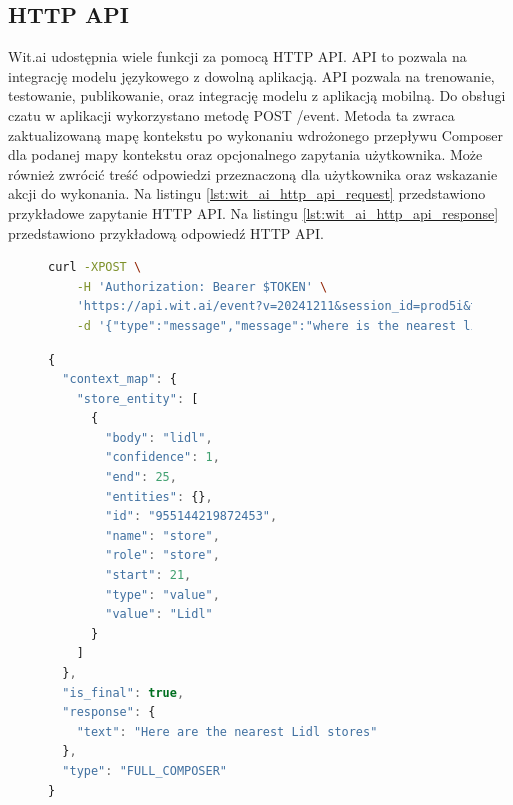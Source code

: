 \subsection{HTTP API}
Wit.ai udostępnia wiele funkcji za pomocą HTTP API. API to pozwala na integrację modelu językowego z dowolną aplikacją. API pozwala na trenowanie, testowanie, publikowanie, oraz integrację modelu z aplikacją mobilną. Do obsługi czatu w aplikacji wykorzystano metodę POST /event. Metoda ta zwraca zaktualizowaną mapę kontekstu po wykonaniu wdrożonego przepływu Composer dla podanej mapy kontekstu oraz opcjonalnego zapytania użytkownika. Może również zwrócić treść odpowiedzi przeznaczoną dla użytkownika oraz wskazanie akcji do wykonania. \cite{witai_http_api} Na listingu \ref{lst:wit_ai_http_api_request} przedstawiono przykładowe zapytanie HTTP API.
Na listingu \ref{lst:wit_ai_http_api_response} przedstawiono przykładową odpowiedź HTTP API.

\begin{figure}[H]
\begin{lstlisting}[language=bash, caption=Przykładowe zapytanie HTTP API, label=lst:wit_ai_http_api_request]
    curl -XPOST \
    -H 'Authorization: Bearer $TOKEN' \
    'https://api.wit.ai/event?v=20241211&session_id=prod5i&tag=1.0&context_map=%7B%7D' \
    -d '{"type":"message","message":"where is the nearest lidl?"}'  
\end{lstlisting}
\end{figure}
\label{lst:wit_ai_http_api_request}

\begin{figure}[H]
\begin{lstlisting}[language=javascript, caption=Przykładowa odpowiedź HTTP API, label=lst:wit_ai_http_api_response]
{
  "context_map": {
    "store_entity": [
      {
        "body": "lidl",
        "confidence": 1,
        "end": 25,
        "entities": {},
        "id": "955144219872453",
        "name": "store",
        "role": "store",
        "start": 21,
        "type": "value",
        "value": "Lidl"
      }
    ]
  },
  "is_final": true,
  "response": {
    "text": "Here are the nearest Lidl stores"
  },
  "type": "FULL_COMPOSER"
}
\end{lstlisting}
\end{figure}
\label{lst:wit_ai_http_api_response}

